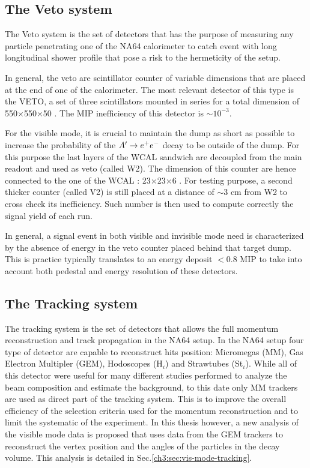 \subsection{The Veto system}
\label{ch2:sec:detectors-veto}

The Veto system is the set of detectors that has the purpose of measuring any particle penetrating one of the NA64 calorimeter to catch event with long longitudinal shower profile that pose a risk to the hermeticity of the setup.

In general, the veto are scintillator counter of variable dimensions that are placed at the end of one of the calorimeter. The most relevant detector of this type is the VETO, a set of three scintillators mounted in series for a total dimension of 550$\times$550$\times$50 \mmc. The MIP inefficiency of this detector is $\sim 10^{-3}$.

For the visible mode, it is crucial to maintain the dump as short as possible to increase the probability of the $A' \to e^+e^-$ decay to be outside of the dump. For this purpose the last layers of the WCAL sandwich are decoupled from the main readout and used as veto (called W2). The dimension of this counter are hence connected to the one of the WCAL : 23$\times$23$\times$6 \mmc. For testing purpose, a second thicker counter (called V2) is still placed at a distance of $\sim3$ \si{cm} from W2 to cross check its inefficiency. Such number is then used to compute correctly the signal yield of each run.

In general, a signal event in both visible and invisible mode need is characterized by the absence of energy in the veto counter placed behind that target dump. This is practice typically translates to an energy deposit $<$0.8 MIP to take into account both pedestal and energy resolution of these detectors.

\subsection{The Tracking system}
\label{ch2:sec:detectors-tracking}

The tracking system is the set of detectors that allows the full momentum reconstruction and track propagation in the NA64 setup. In the NA64 setup four type of detector are capable to reconstruct hits position: Micromegas (MM), Gas Electron Multipler (GEM), Hodoscopes (H$_i$) and Strawtubes (St$_i$). While all of this detector were useful for many different studies performed to analyze the beam composition and estimate the background, to this date only MM trackers are used as direct part of the tracking system. This is to improve the overall efficiency of the selection criteria used for the momentum reconstruction and to limit the systematic of the experiment. In this thesis however, a new analysis of the visible mode data is proposed that uses data from the GEM trackers to reconstruct the vertex position and the angles of the particles in the decay volume. This analysis is detailed in Sec.\ref{ch3:sec:vis-mode-tracking}.

